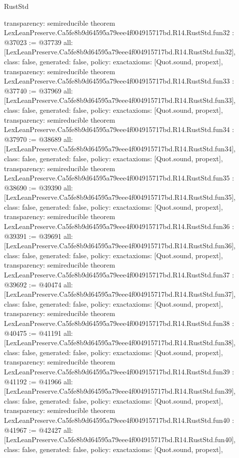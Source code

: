 \begin{lexlean}{RustStd}
\begin{coremodule}
{  transparency: semireducible
}
theorem LexLeanPreserve.Ca5fe8b9d64595a79eee4f004915717bd.R14.RustStd.fun32 : @37023 := @37739 {
  all: [LexLeanPreserve.Ca5fe8b9d64595a79eee4f004915717bd.R14.RustStd.fun32],
  class: false,
  generated: false,
  policy: exact{axioms: [Quot.sound, propext]},
  transparency: semireducible
}
theorem LexLeanPreserve.Ca5fe8b9d64595a79eee4f004915717bd.R14.RustStd.fun33 : @37740 := @37969 {
  all: [LexLeanPreserve.Ca5fe8b9d64595a79eee4f004915717bd.R14.RustStd.fun33],
  class: false,
  generated: false,
  policy: exact{axioms: [Quot.sound, propext]},
  transparency: semireducible
}
theorem LexLeanPreserve.Ca5fe8b9d64595a79eee4f004915717bd.R14.RustStd.fun34 : @37970 := @38689 {
  all: [LexLeanPreserve.Ca5fe8b9d64595a79eee4f004915717bd.R14.RustStd.fun34],
  class: false,
  generated: false,
  policy: exact{axioms: [Quot.sound, propext]},
  transparency: semireducible
}
theorem LexLeanPreserve.Ca5fe8b9d64595a79eee4f004915717bd.R14.RustStd.fun35 : @38690 := @39390 {
  all: [LexLeanPreserve.Ca5fe8b9d64595a79eee4f004915717bd.R14.RustStd.fun35],
  class: false,
  generated: false,
  policy: exact{axioms: [Quot.sound, propext]},
  transparency: semireducible
}
theorem LexLeanPreserve.Ca5fe8b9d64595a79eee4f004915717bd.R14.RustStd.fun36 : @39391 := @39691 {
  all: [LexLeanPreserve.Ca5fe8b9d64595a79eee4f004915717bd.R14.RustStd.fun36],
  class: false,
  generated: false,
  policy: exact{axioms: [Quot.sound, propext]},
  transparency: semireducible
}
theorem LexLeanPreserve.Ca5fe8b9d64595a79eee4f004915717bd.R14.RustStd.fun37 : @39692 := @40474 {
  all: [LexLeanPreserve.Ca5fe8b9d64595a79eee4f004915717bd.R14.RustStd.fun37],
  class: false,
  generated: false,
  policy: exact{axioms: [Quot.sound, propext]},
  transparency: semireducible
}
theorem LexLeanPreserve.Ca5fe8b9d64595a79eee4f004915717bd.R14.RustStd.fun38 : @40475 := @41191 {
  all: [LexLeanPreserve.Ca5fe8b9d64595a79eee4f004915717bd.R14.RustStd.fun38],
  class: false,
  generated: false,
  policy: exact{axioms: [Quot.sound, propext]},
  transparency: semireducible
}
theorem LexLeanPreserve.Ca5fe8b9d64595a79eee4f004915717bd.R14.RustStd.fun39 : @41192 := @41966 {
  all: [LexLeanPreserve.Ca5fe8b9d64595a79eee4f004915717bd.R14.RustStd.fun39],
  class: false,
  generated: false,
  policy: exact{axioms: [Quot.sound, propext]},
  transparency: semireducible
}
theorem LexLeanPreserve.Ca5fe8b9d64595a79eee4f004915717bd.R14.RustStd.fun40 : @41967 := @42427 {
  all: [LexLeanPreserve.Ca5fe8b9d64595a79eee4f004915717bd.R14.RustStd.fun40],
  class: false,
  generated: false,
  policy: exact{axioms: [Quot.sound, propext]},
}
\end{coremodule}
\end{lexlean}
